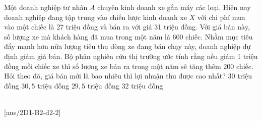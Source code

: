 \begin{ex}
	Một doanh nghiệp tư nhân $A$ chuyên kinh doanh xe gắn máy các loại. Hiện nay doanh nghiệp đang tập trung vào chiến lược kinh doanh xe $X$ với chi phí mua vào một chiếc là 27 triệu đồng và bán ra với giá 31 triệu đồng. Với giá bán này, số lượng xe mà khách hàng đã mua trong một năm là 600 chiếc. Nhằm mục tiêu đẩy mạnh hơn nữa lượng tiêu thụ dòng xe đang bán chạy này, doanh nghiệp dự định giảm giá bán. Bộ phận nghiên cứu thị trường ước tính rằng nếu giảm 1 triệu đồng mỗi chiếc xe thì số lượng xe bán ra trong một năm sẽ tăng thêm 200 chiếc. Hỏi theo đó, giá bán mới là bao nhiêu thì lợi nhuận thu được cao nhất?
	\choice
	{$30$ triệu đồng}
	{\True $30,5$ triệu đồng}
	{$29,5$ triệu đồng}
	{$32$ triệu đồng}
\end{ex}
 \\
[ans/2D1-B2-d2-2]

